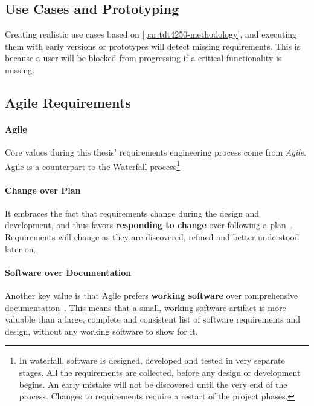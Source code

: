\subsection{Use Cases and Prototyping}

Creating realistic use cases based on \cref{par:tdt4250-methodology}, and executing them with early versions or prototypes will detect missing requirements.
This is because a user will be blocked from progressing if a critical functionality is missing.


\subsection{Agile Requirements}\label{subsec:req-agile}

\paragraph{Agile}
Core values during this thesis' requirements engineering process come from \textit{Agile}.
Agile is a counterpart to the Waterfall process\footnote{In waterfall, software is designed, developed and tested in very separate stages. All the requirements are collected, before any design or development begins. An early mistake will not be discovered until the very end of the process. Changes to requirements require a restart of the project phases.}


\paragraph{Change over Plan}
It embraces the fact that requirements change during the design and development, and thus favors \textbf{responding to change} over following a plan~\cite{kentbeckManifestoAgileSoftware2001}.
Requirements will change as they are discovered, refined and better understood later on.


\paragraph{Software over Documentation}
Another key value is that Agile prefers \textbf{working software} over comprehensive documentation~\cite{kentbeckManifestoAgileSoftware2001}.
This means that a small, working software artifact is more valuable than a large, complete and consistent list of software requirements and design, without any working software to show for it.


